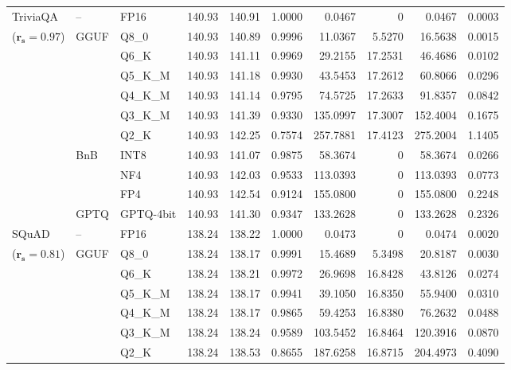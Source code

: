 \begin{longtable}{ll l rrrrrrr}
\midrule
TriviaQA & -- & FP16 & 140.93 & 140.91 & 1.0000 & 0.0467 & \cellcolor{cyan!12} $0$ & 0.0467 & 0.0003 \\
{\small ($\mathbf{r_s{=}0.97}$)} & GGUF & Q8\_0 & 140.93 & 140.89 & 0.9996 & 11.0367 & 5.5270 & 16.5638 & 0.0015 \\
 &  & Q6\_K & 140.93 & 141.11 & 0.9969 & 29.2155 & 17.2531 & 46.4686 & 0.0102 \\
 &  & Q5\_K\_M & 140.93 & 141.18 & 0.9930 & 43.5453 & 17.2612 & 60.8066 & 0.0296 \\
 &  & Q4\_K\_M & 140.93 & 141.14 & 0.9795 & 74.5725 & 17.2633 & 91.8357 & 0.0842 \\
 &  & Q3\_K\_M & 140.93 & 141.39 & \cellcolor{red!18} 0.9330 & \cellcolor{red!18} 135.0997 & 17.3007 & \cellcolor{red!18} 152.4004 & \cellcolor{red!18} 0.1675 \\
 &  & Q2\_K & 140.93 & 142.25 & \cellcolor{red!35} 0.7574 & \cellcolor{red!35} 257.7881 & 17.4123 & \cellcolor{red!35} 275.2004 & \cellcolor{red!35} 1.1405 \\
 & BnB & INT8 & 140.93 & 141.07 & 0.9875 & 58.3674 & \cellcolor{cyan!12} $0$ & 58.3674 & 0.0266 \\
 &  & NF4 & 140.93 & 142.03 & 0.9533 & 113.0393 & \cellcolor{cyan!12} $0$ & 113.0393 & 0.0773 \\
 &  & FP4 & 140.93 & 142.54 & \cellcolor{red!18} 0.9124 & \cellcolor{red!18} 155.0800 & \cellcolor{cyan!12} $0$ & \cellcolor{red!18} 155.0800 & \cellcolor{red!18} 0.2248 \\
 & GPTQ & GPTQ-4bit & 140.93 & 141.30 & \cellcolor{red!18} 0.9347 & \cellcolor{red!18} 133.2628 & \cellcolor{cyan!12} $0$ & \cellcolor{red!18} 133.2628 & \cellcolor{red!18} 0.2326 \\
\midrule
SQuAD & -- & FP16 & 138.24 & 138.22 & 1.0000 & 0.0473 & \cellcolor{cyan!12} $0$ & 0.0474 & 0.0020 \\
{\small ($\mathbf{r_s{=}0.81}$)} & GGUF & Q8\_0 & 138.24 & 138.17 & 0.9991 & 15.4689 & 5.3498 & 20.8187 & 0.0030 \\
 &  & Q6\_K & 138.24 & 138.21 & 0.9972 & 26.9698 & 16.8428 & 43.8126 & 0.0274 \\
 &  & Q5\_K\_M & 138.24 & 138.17 & 0.9941 & 39.1050 & 16.8350 & 55.9400 & 0.0310 \\
 &  & Q4\_K\_M & 138.24 & 138.17 & 0.9865 & 59.4253 & 16.8380 & 76.2632 & 0.0488 \\
 &  & Q3\_K\_M & 138.24 & 138.24 & 0.9589 & 103.5452 & 16.8464 & 120.3916 & 0.0870 \\
 &  & Q2\_K & 138.24 & 138.53 & \cellcolor{red!18} 0.8655 & \cellcolor{red!18} 187.6258 & 16.8715 & \cellcolor{red!18} 204.4973 & \cellcolor{red!18} 0.4090 \\

\end{longtable}
